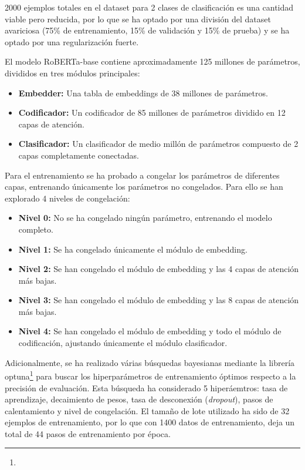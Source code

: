 2000 ejemplos totales en el dataset para 2 clases de clasificación es una cantidad viable pero reducida, por lo que se ha optado por una división del dataset avariciosa (75\% de entrenamiento, 15\% de validación y 15\% de prueba) y se ha optado por una regularización fuerte.

El modelo RoBERTa-base contiene aproximadamente 125 millones de parámetros, divididos en tres módulos principales: 

\begin{itemize}
  \item\textbf{Embedder: }Una tabla de embeddings de 38 millones de parámetros.
  \item\textbf{Codificador: }Un codificador de 85 millones de parámetros dividido en 12 capas de atención.
  \item\textbf{Clasificador: }Un clasificador de medio millón de parámetros compuesto de 2 capas completamente conectadas. 
\end{itemize}


Para el entrenamiento se ha probado a congelar los parámetros de diferentes capas, entrenando únicamente los parámetros no congelados. Para ello se han explorado 4 niveles de congelación:

\begin{itemize}
  \item\textbf{Nivel 0: }No se ha congelado ningún parámetro, entrenando el modelo completo.
  \item\textbf{Nivel 1: }Se ha congelado únicamente el módulo de embedding.
  \item\textbf{Nivel 2: }Se han congelado el módulo de embedding y las 4 capas de atención más bajas.
  \item\textbf{Nivel 3: }Se han congelado el módulo de embedding y las 8 capas de atención más bajas.
  \item\textbf{Nivel 4: }Se han congelado el módulo de embedding y todo el módulo de codificación, ajustando únicamente el módulo clasificador. 
\end{itemize}

Adicionalmente, se ha realizado várias búsquedas bayesianas mediante la librería optuna\footnote{} para buscar los hiperparámetros de entrenamiento óptimos respecto a la precisión de evaluación. Esta búsqueda ha considerado 5 hiperáemtros: tasa de aprendizaje, decaimiento de pesos, tasa de desconexión (\textit{dropout}), pasos de calentamiento y nivel de congelación. El tamaño de lote utilizado ha sido de 32 ejemplos de entrenamiento, por lo que con 1400 datos de entrenamiento, deja un total de 44 pasos de entrenamiento por época. 

